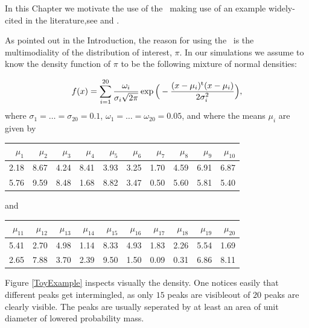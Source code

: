 In this Chapter we motivate the use of the \PT\, making use of an example widely-cited in the literature,see \cite{BaragattiParallelTemperingWithEquiEnergyMoves} and \citet*{FamingLiang}. 

As pointed out in the Introduction, the reason for using the \PT\, is the multimodiality of the distribution of interest, $\pi$. In our simulations we assume to know the density function of $\pi$ to be the following mixture of normal densities:

\begin{equation}\label{experimental pi}
f(x) = 
\sum_{i=1}^{20} \frac{\omega_i}{ \sigma_i \sqrt{2 \pi} } \exp \Big( -\frac{(x - \mu_i)^{\mathrm{t}} (x - \mu_i)}{2 \sigma_i^2} \Big),	
\end{equation}
where $\sigma_1 = \dots = \sigma_{20} = 0.1$, $\omega_1 = \dots = \omega_{20} = 0.05 $, and where  the means $\mu_i$ are given by

\begin{table}[ht]
	\centering
\begin{tabular}{rrrrrrrrrr}
  \hline
$\mu_1$ & $\mu_2$ & $\mu_3$ & $\mu_4$ & $\mu_5$ & $\mu_6$ & $\mu_7$ & $\mu_8$ & $\mu_9$ & $\mu_{10}$ \\ 
  \hline
2.18 & 8.67 & 4.24 & 8.41 & 3.93 & 3.25 & 1.70 & 4.59 & 6.91 & 6.87 \\ 
  5.76 & 9.59 & 8.48 & 1.68 & 8.82 & 3.47 & 0.50 & 5.60 & 5.81 & 5.40 \\ 
   \hline
\end{tabular}
\end{table}
and 

\begin{table}[ht]
	\centering
\begin{tabular}{rrrrrrrrrr}
  \hline
$\mu_{11}$ & $\mu_{12}$ & $\mu_{13}$ & $\mu_{14}$ & $\mu_{15}$ & $\mu_{16}$ & $\mu_{17}$ & $\mu_{18}$ & $\mu_{19}$ & $\mu_{20}$ \\ 
  \hline
5.41 & 2.70 & 4.98 & 1.14 & 8.33 & 4.93 & 1.83 & 2.26 & 5.54 & 1.69 \\ 
  2.65 & 7.88 & 3.70 & 2.39 & 9.50 & 1.50 & 0.09 & 0.31 & 6.86 & 8.11 \\ 
   \hline
\end{tabular}
\end{table}
 
Figure \ref{ToyExample} inspects visually the density. One notices easily that different peaks get intermingled, as only $15$ peaks are visibleout of $20$ peaks are clearly visible. The peaks are usually seperated by at least an area of unit diameter of lowered probability mass.   

